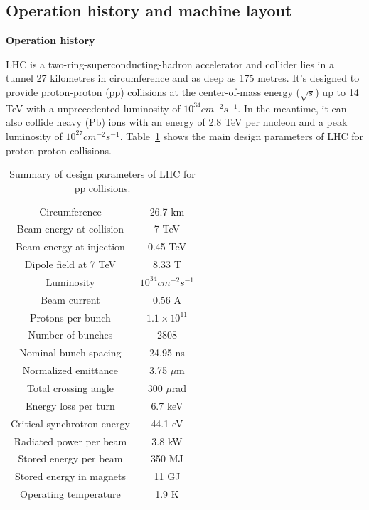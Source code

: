\subsection{Operation history and machine layout}

\textbf{Operation history}

LHC \cite{Bruning:2004ej, Buning:2004wk, Benedikt:2004wm, Evans_2008} 
is a two-ring-superconducting-hadron accelerator and collider lies in a tunnel 27 kilometres in circumference and as deep as 175 metres.
It's designed to provide proton-proton (pp) collisions at the center-of-mass energy ($\sqrt{s}$) up to 14 TeV
with a unprecedented luminosity of $10^{34} cm^{-2} s^{-1}$.
In the meantime, it can also collide heavy (Pb) ions with an energy of 2.8 TeV per nucleon and a peak luminosity of $10^{27} cm^{-2} s^{-1}$.
Table~\ref{tab:LHC_parameters} shows the main design parameters of LHC for proton-proton collisions.
\begin{table}[htbp]
  \centering
  \caption{Summary of design parameters of LHC for pp collisions.}
  \label{tab:LHC_parameters}
  \begin{tabular}{cc}
    \hline
    Circumference	& 26.7 km\\
    Beam energy at collision	& 7 TeV\\
    Beam energy at injection	& 0.45 TeV \\
    Dipole field at 7 TeV	& 8.33 T \\
    Luminosity		& $10^{34} cm^{-2} s^{-1}$ \\
    Beam current	& 0.56 A \\
    Protons per bunch	& $1.1 \times 10^{11}$ \\
    Number of bunches	& 2808 \\
    Nominal bunch spacing	& 24.95 ns \\
    Normalized emittance	& 3.75 $\mu$m \\
    Total crossing angle	& 300 $\mu$rad \\
    Energy loss per turn	& 6.7 keV \\
    Critical synchrotron energy	& 44.1 eV \\
    Radiated power per beam	& 3.8 kW \\
    Stored energy per beam	& 350 MJ \\
    Stored energy in magnets	& 11 GJ \\
    Operating temperature	& 1.9 K \\
    \hline
  \end{tabular}
\end{table}

